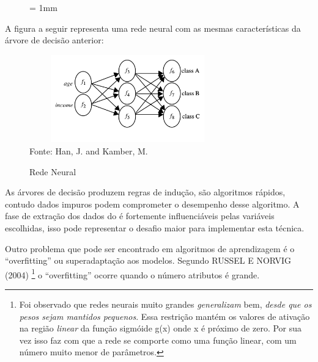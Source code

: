 \vspace{2cm}

\begin{figure}[ht] \unitlength= 1mm \thicklines
\end{figure}

\vspace{3cm} 

A figura a seguir representa uma rede neural com as mesmas características da árvore de decisão anterior:
\begin{figure}[!ht]
	\centering
	\caption{Rede Neural}
	\includegraphics[width=85mm, height=38mm]{Figuras/BigData/redeneural.png}\\
	\tiny Fonte: Han, J. and Kamber, M. 
\end{figure}  

As árvores de decisão produzem regras de indução, são algoritmos rápidos, contudo dados impuros podem comprometer o desempenho desse algoritmo. 
A fase de extração dos dados do é fortemente influenciáveis pelas variáveis escolhidas, \cite{DecisionTree} 
isso pode representar o desafio maior para implementar esta técnica. 

Outro problema que pode ser encontrado em algoritmos de aprendizagem é o ``overfitting'' ou superadaptação aos modelos.
Segundo RUSSEL E NORVIG (2004)  \footnote{Foi observado que redes neurais muito grandes \textit{generalizam} bem, 
\textit{desde que os pesos sejam mantidos pequenos}. Essa restrição mantém os valores de ativação na região 
\textit{linear} da função sigmóide g(x) onde x é próximo de zero. Por sua vez isso faz com que a rede se comporte 
como uma função linear, com um número muito menor de parâmetros.} o ``overfitting'' ocorre quando o número atributos é grande.


